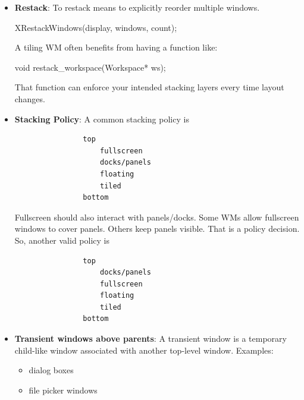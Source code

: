\documentclass{report}
\begin{document}
\begin{itemize}
\begin{itemize}
                \item demoting floating windows
                \item keeping tiled windows below floating windows
                \item restoring a normal window after fullscreen mode
            \end{itemize}
        \item \textbf{Restack}: To restack means to explicitly reorder multiple windows.
            \bigbreak \noindent 
            \begin{cppcode}
            XRestackWindows(display, windows, count);
            \end{cppcode}
            \bigbreak \noindent 
            A tiling WM often benefits from having a function like:
            \bigbreak \noindent 
            \begin{cppcode}
            void restack_workspace(Workspace* ws);
            \end{cppcode}
            \bigbreak \noindent 
            That function can enforce your intended stacking layers every time layout changes.
            \bigbreak \noindent 
        \item \textbf{Stacking Policy}: A common stacking policy is
            \begin{verbatim}
                top
                    fullscreen
                    docks/panels
                    floating
                    tiled
                bottom
            \end{verbatim}
            Fullscreen should also interact with panels/docks. Some WMs allow fullscreen windows to cover panels. Others keep panels visible. That is a policy decision.
            \bigbreak \noindent 
            So, another valid policy is 
            \begin{verbatim}
                top
                    docks/panels
                    fullscreen
                    floating
                    tiled
                bottom
            \end{verbatim}
        \item \textbf{Transient windows above parents}: 
            A transient window is a temporary child-like window associated with another top-level window.
            \bigbreak \noindent 
            Examples:
            \begin{itemize}
                \item dialog boxes
                \item file picker windows

\end{itemize}
\end{itemize}
\end{document}
